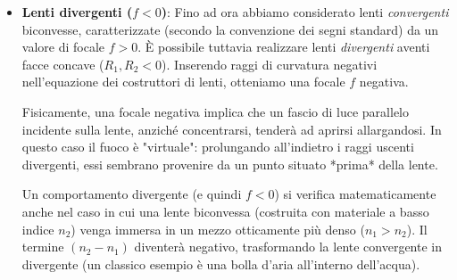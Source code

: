 \documentclass[openany,a4paper,12pt]{book}
\begin{document}
\begin{itemize}
\begin{figure}[H]
\caption{Configurazione a due lenti (espansore di fascio) per l'allargamento e la ricollimazione di un laser.}
\label{fig:due_lenti_laser}
\end{figure}

    \item \textbf{Lenti divergenti ($f < 0$)}: Fino ad ora abbiamo considerato lenti \textit{convergenti} biconvesse, caratterizzate (secondo la convenzione dei segni standard) da un valore di focale $f > 0$. È possibile tuttavia realizzare lenti \textit{divergenti} aventi facce concave ($R_1, R_2 < 0$). Inserendo raggi di curvatura negativi nell'equazione dei costruttori di lenti, otteniamo una focale $f$ negativa.
    
    Fisicamente, una focale negativa implica che un fascio di luce parallelo incidente sulla lente, anziché concentrarsi, tenderà ad aprirsi allargandosi. In questo caso il fuoco è "virtuale": prolungando all'indietro i raggi uscenti divergenti, essi sembrano provenire da un punto situato *prima* della lente. 
    
    Un comportamento divergente (e quindi $f < 0$) si verifica matematicamente anche nel caso in cui una lente biconvessa (costruita con materiale a basso indice $n_2$) venga immersa in un mezzo otticamente più denso ($n_1 > n_2$). Il termine $(n_2 - n_1)$ diventerà negativo, trasformando la lente convergente in divergente (un classico esempio è una bolla d'aria all'interno dell'acqua).

\begin{figure}[H]
\centering
{}
\end{figure}
\end{itemize}
\end{document}
